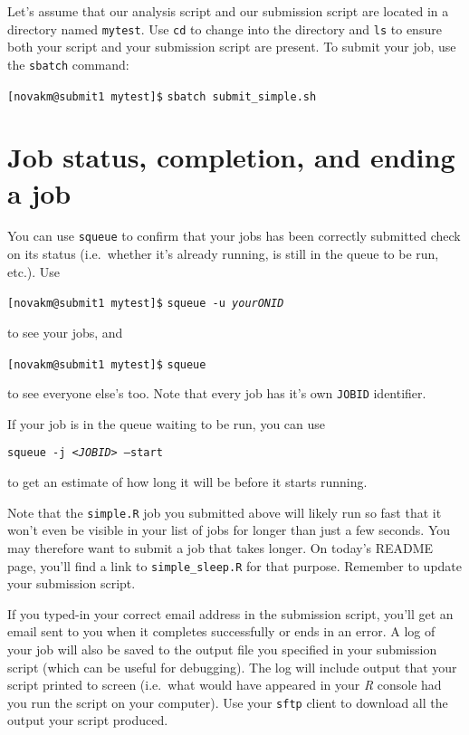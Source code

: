 \documentclass[12pt,letterpaper]{article}
\begin{document}
Let's assume that our analysis script and our submission script are located in a directory named \texttt{mytest}.
Use \texttt{cd} to change into the directory and \texttt{ls} to ensure both your script and your submission script are present.
To submit your job, use the \texttt{sbatch} command:

\texttt{[novakm@submit1 mytest]\$} \texttt{sbatch submit\_simple.sh}
\\


\section{Job status, completion, and ending a job}

\noindent
You can use \texttt{squeue} to confirm that your jobs has been correctly submitted check on its status
(i.e.~whether it's already running, is still in the queue to be run, etc.).
Use

\texttt{[novakm@submit1 mytest]\$} \texttt{squeue -u \textit{yourONID}}

\noindent
to see your jobs, and

\texttt{[novakm@submit1 mytest]\$} \texttt{squeue}

\noindent
to see everyone else's too.
Note that every job has it's own \texttt{JOBID} identifier.

\noindent
If your job is in the queue waiting to be run, you can use 

\texttt{squeue -j <\emph{JOBID}> --start}

\noindent
to get an estimate of how long it will be before it starts running.

\begin{tcolorbox}[breakable, enhanced, before upper={\parindent15pt}]
	\noindent
	Note that the \texttt{simple.R} job you submitted above will likely run so fast that it won't even be visible in your list of jobs for longer than just a few seconds.  You may therefore want to submit a job that takes longer.  On today's README page, you'll find a link to \texttt{simple\_sleep.R} for that purpose.  Remember to update your submission script.
\end{tcolorbox}

If you typed-in your correct email address in the submission script, you'll get an email sent to you when it completes successfully or ends in an error.
A log of your job will also be saved to the output file you specified in your submission script (which can be useful for debugging).
The log will include output that your script printed to screen (i.e.~what would have appeared in your \emph{R} console had you run the script on your computer).
Use your \texttt{sftp} client to download all the output your script produced.
\end{document}
